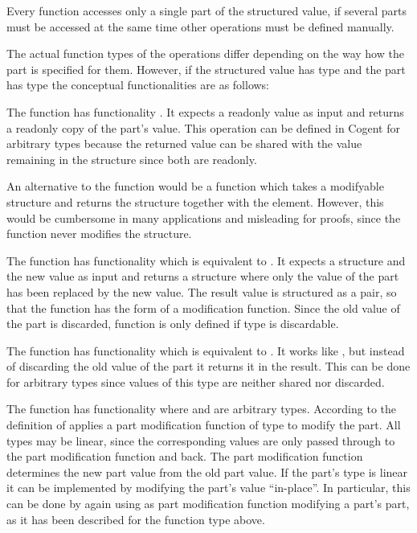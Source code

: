 Every function accesses only a single part of the structured value, if several parts must be accessed at the same
time other operations must be defined manually.

The actual function types of the operations differ depending on the way how the part is specified for them.
However, if the structured value has type  and the part has type  the conceptual functionalities 
are as follows:

The function  has functionality . It expects a readonly value as input and returns
a readonly copy of the part's value. This operation can be defined in Cogent for arbitrary types 
because the returned value can be shared with the value remaining in the structure since both are readonly.

An alternative to the function  would be a function which takes a modifyable structure and returns the structure
together with the element. However, this would be cumbersome in many applications and misleading for proofs, since 
the function never modifies the structure. 

The function  has functionality  which is equivalent to . 
It expects a structure and the new value as input
and returns a structure where only the value of the part has been replaced by the new value. The result value is 
structured as a pair, so that the function has the form of a modification function. Since the old
value of the part is discarded, function  is only defined if type  is discardable.

The function  has functionality  which is equivalent to . 
It works like , but instead of
discarding the old value of the part it returns it in the result. This can be done for arbitrary types 
since values of this type are neither shared nor discarded.

The function  has functionality  where  and  are
arbitrary types.
According to the definition of   applies a part modification function of
type  to modify the part. All types may be linear, since the corresponding values are
only passed through to the part modification function and back.
The part modification function determines the new part value from the old part value. If the part's type 
is linear it can be implemented by modifying the part's value ``in-place''. In particular, this can be done by
again using  as part modification function modifying a part's part, as it has been described
for the function type  above.

